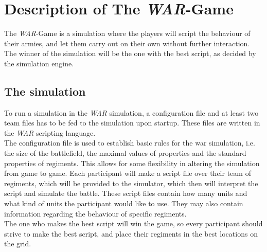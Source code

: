 
\section{ Description of The \textit{WAR}-Game }
\label{sec:describeWAR}
The \textit{WAR}-Game is a simulation where the players will script the behaviour of their armies, and let them carry out on their own without further interaction. The winner of the simulation will be the one with the best script, as decided by the simulation engine. \\
	\subsection{The simulation}
		To run a simulation in the \textit{WAR} simulation, a configuration file and at least two team files has to be fed to the simulation upon startup. 
		These files are written in the \textit{WAR} scripting language.
		\\
		The configuration file is used to establish basic rules for the war simulation, i.e. the size of the battlefield, the maximal values of properties and the standard properties of regiments.
		This allows for some flexibility in altering the simulation from game to game.
		Each participant will make a script file over their team of regiments, which will be provided to the simulator, 
		which then will interpret the script and simulate the battle. 
		These script files contain how many units and what kind of units the participant would like to use. 
		They may also contain information regarding the behaviour of specific regiments. 
		\\
		The one who makes the best script will win the game, so every participant should strive to make the best script, 
		and place their regiments in the best locations on the grid.
		\\

